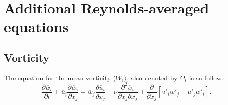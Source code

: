 \documentclass[oneside,a4paper,11pt]{report}
\newcommand{\uavg}{\overline{u}}
\newcommand{\wavg}{\overline{w}}
\newcommand{\ufluc}{u'}
\newcommand{\wfluc}{w'}
\newcommand{\wiavg}{\langle W_i \rangle}
\begin{document}
\section{Additional Reynolds-averaged equations}

\subsection{Vorticity}
The equation for the mean vorticity $\wiavg$, also denoted by $\Omega_i$ is as follows
\begin{equation}
\frac{\partial \wavg_i}{\partial t} + \uavg_j \frac{\partial \wavg_i}{\partial x_j} = \wavg_j \frac{\partial \uavg_i}{\partial x_j} + \nu \frac{\partial^2 \wavg_i}{\partial x_j \partial x_j} + \frac{\partial}{\partial x_j} \left [ \overline{\ufluc_i \wfluc_j} - \overline{\ufluc_j \wfluc_i} \right ].
\end{equation}

\end{document}
